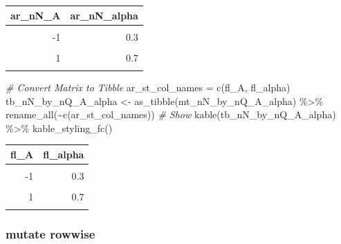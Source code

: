 \documentclass[
]{book}
\newenvironment{Shaded}{\begin{snugshade}}{\end{snugshade}}
\newcommand{\CommentTok}[1]{\textcolor[rgb]{0.56,0.35,0.01}{\textit{#1}}}
\newcommand{\FunctionTok}[1]{\textcolor[rgb]{0.00,0.00,0.00}{#1}}
\newcommand{\NormalTok}[1]{#1}
\newcommand{\OtherTok}[1]{\textcolor[rgb]{0.56,0.35,0.01}{#1}}
\newcommand{\SpecialCharTok}[1]{\textcolor[rgb]{0.00,0.00,0.00}{#1}}
\newcommand{\StringTok}[1]{\textcolor[rgb]{0.31,0.60,0.02}{#1}}
\begin{document}
\begin{table}[!h]
\centering
\begin{tabular}{r|r}
\hline
ar\_nN\_A & ar\_nN\_alpha\\
\hline
\cellcolor{gray!6}{-2} & \cellcolor{gray!6}{0.1}\\
\hline
-1 & 0.3\\
\hline
\cellcolor{gray!6}{0} & \cellcolor{gray!6}{0.5}\\
\hline
1 & 0.7\\
\hline
\cellcolor{gray!6}{2} & \cellcolor{gray!6}{0.9}\\
\hline
\end{tabular}
\end{table}

\begin{Shaded}
\begin{Highlighting}[]
\CommentTok{\# Convert Matrix to Tibble}
\NormalTok{ar\_st\_col\_names }\OtherTok{=} \FunctionTok{c}\NormalTok{(}\StringTok{\textquotesingle{}fl\_A\textquotesingle{}}\NormalTok{, }\StringTok{\textquotesingle{}fl\_alpha\textquotesingle{}}\NormalTok{)}
\NormalTok{tb\_nN\_by\_nQ\_A\_alpha }\OtherTok{\textless{}{-}} \FunctionTok{as\_tibble}\NormalTok{(mt\_nN\_by\_nQ\_A\_alpha) }\SpecialCharTok{\%\textgreater{}\%}
  \FunctionTok{rename\_all}\NormalTok{(}\SpecialCharTok{\textasciitilde{}}\FunctionTok{c}\NormalTok{(ar\_st\_col\_names))}
\CommentTok{\# Show}
\FunctionTok{kable}\NormalTok{(tb\_nN\_by\_nQ\_A\_alpha) }\SpecialCharTok{\%\textgreater{}\%}
  \FunctionTok{kable\_styling\_fc}\NormalTok{()}
\end{Highlighting}
\end{Shaded}

\begin{table}[!h]
\centering
\begin{tabular}{r|r}
\hline
fl\_A & fl\_alpha\\
\hline
\cellcolor{gray!6}{-2} & \cellcolor{gray!6}{0.1}\\
\hline
-1 & 0.3\\
\hline
\cellcolor{gray!6}{0} & \cellcolor{gray!6}{0.5}\\
\hline
1 & 0.7\\
\hline
\cellcolor{gray!6}{2} & \cellcolor{gray!6}{0.9}\\
\hline
\end{tabular}
\end{table}

\hypertarget{mutate-rowwise}{%
\subsubsection{mutate rowwise}\label{mutate-rowwise}}
\end{document}
